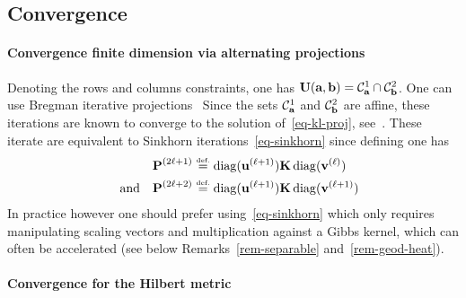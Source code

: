 \subsection{Convergence}

\paragraph{Convergence finite dimension via alternating projections}
 

Denoting 
the rows and columns constraints, one has $\CouplingsD(\a,\b) = \Cc^1_\a \cap \Cc^2_\b$. One can use Bregman iterative projections~\cite{bregman1967relaxation}
Since the sets $\Cc^1_\a$ and $\Cc^2_\b$ are affine, these iterations are known to converge to the solution of~\eqref{eq-kl-proj}, see~\cite{bregman1967relaxation}. These iterate are equivalent to Sinkhorn iterations~\eqref{eq-sinkhorn} since defining 
\eq{\label{eq-sink-matrix}\P^{(2\ell)} \eqdef \diag(\it{\uD}) \K \diag(\it{\vD}),}
one has
\begin{align*}
	\P^{(2\ell+1)} &\eqdef \diag(\itt{\uD}) \K \diag(\it{\vD}) \\
	\qandq
	\P^{(2\ell+2)} &\eqdef \diag(\itt{\uD}) \K \diag(\itt{\vD})
\end{align*}
In practice however one should prefer using~\eqref{eq-sinkhorn} which only requires manipulating scaling vectors and multiplication against a Gibbs kernel, which can often be accelerated (see below Remarks~\ref{rem-separable} and~\ref{rem-geod-heat}). 
 



\paragraph{Convergence for the Hilbert metric}

